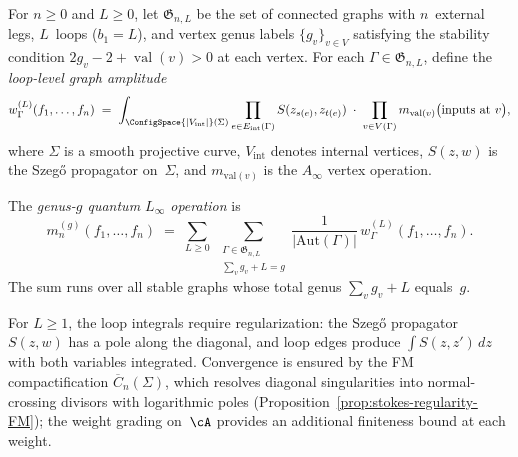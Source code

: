 \begin{definition}
\label{def:loop-level-graph-ops}
For $n \geq 0$ and $L \geq 0$, let
$\mathfrak{G}_{n,L}$ be the set of connected graphs with
$n$~external legs, $L$~loops ($b_1 = L$), and vertex genus
labels $\{g_v\}_{v \in V}$ satisfying the stability condition
$2g_v - 2 + \operatorname{val}(v) > 0$ at each vertex.
For each $\Gamma \in \mathfrak{G}_{n,L}$, define the
\emph{loop-level graph amplitude}
\begin{equation}\label{eq:loop-amplitude}
w_\Gamma^{(L)}(f_1, \ldots, f_n)
\;=\;
\int_{\ConfigSpace{|V_{\mathrm{int}}|}(\Sigma)}
\prod_{e \in E_{\mathrm{int}}(\Gamma)} S(z_{s(e)}, z_{t(e)})
\;\cdot\;
\prod_{v \in V(\Gamma)} m_{\mathrm{val}(v)}
\bigl(\text{inputs at } v\bigr),
\end{equation}
where $\Sigma$ is a smooth projective curve,
$V_{\mathrm{int}}$ denotes internal vertices, $S(z,w)$ is
the Szeg\H{o} propagator on~$\Sigma$, and
$m_{\mathrm{val}(v)}$ is the $A_\infty$ vertex operation.

The \emph{genus-$g$ quantum $L_\infty$ operation} is
\begin{equation}\label{eq:quantum-linf-operation}
m_n^{(g)}(f_1, \ldots, f_n)
\;=\;
\sum_{L \geq 0}\;
\sum_{\substack{\Gamma \in \mathfrak{G}_{n,L} \\
 \sum_v g_v + L = g}}
\frac{1}{|\mathrm{Aut}(\Gamma)|}
\, w_\Gamma^{(L)}(f_1, \ldots, f_n).
\end{equation}
The sum runs over all stable graphs whose total genus
$\sum_v g_v + L$ equals~$g$.

For $L \geq 1$, the loop integrals require regularization: the
Szeg\H{o} propagator $S(z,w)$ has a pole along the diagonal, and
loop edges produce $\int S(z,z')\, dz$ with both variables
integrated. Convergence is ensured by the FM compactification
$\overline{C}_n(\Sigma)$, which resolves diagonal singularities
into normal-crossing divisors with logarithmic poles
(Proposition~\ref{prop:stokes-regularity-FM}); the
weight grading on~$\cA$ provides an additional finiteness
bound at each weight.
\end{definition}

